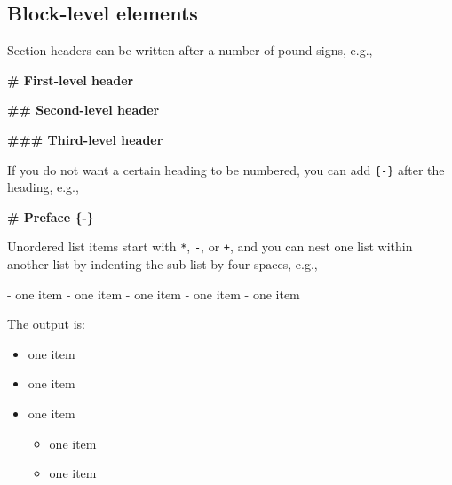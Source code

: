 \documentclass[
  12pt,
]{krantz}
\newenvironment{Shaded}{\begin{snugshade}}{\end{snugshade}}
\newcommand{\FunctionTok}[1]{\textcolor[rgb]{0.13,0.29,0.53}{\textbf{#1}}}
\newcommand{\NormalTok}[1]{#1}
\newcommand{\SpecialStringTok}[1]{\textcolor[rgb]{0.31,0.60,0.02}{#1}}
\providecommand{\tightlist}{%
  \setlength{\itemsep}{0pt}\setlength{\parskip}{0pt}}
\theoremstyle{definition}
\theoremstyle{definition}
\theoremstyle{definition}
\theoremstyle{definition}
\theoremstyle{remark}
\begin{document}
\subsection{Block-level elements}\label{block-level-elements}

Section headers can be written after a number of pound signs, e.g.,

\begin{Shaded}
\begin{Highlighting}[]
\FunctionTok{\# First{-}level header}

\FunctionTok{\#\# Second{-}level header}

\FunctionTok{\#\#\# Third{-}level header}
\end{Highlighting}
\end{Shaded}

If you do not want a certain heading to be numbered, you can add \texttt{\{-\}} after the heading, e.g.,

\begin{Shaded}
\begin{Highlighting}[]
\FunctionTok{\# Preface \{{-}\}}
\end{Highlighting}
\end{Shaded}

Unordered list items start with \texttt{*}, \texttt{-}, or \texttt{+}, and you can nest one list within another list by indenting the sub-list by four spaces, e.g.,

\begin{Shaded}
\begin{Highlighting}[]
\SpecialStringTok{{-} }\NormalTok{one item}
\SpecialStringTok{{-} }\NormalTok{one item}
\SpecialStringTok{{-} }\NormalTok{one item}
\SpecialStringTok{    {-} }\NormalTok{one item}
\SpecialStringTok{    {-} }\NormalTok{one item}
\end{Highlighting}
\end{Shaded}

The output is:

\begin{itemize}
\tightlist
\item
  one item
\item
  one item
\item
  one item

  \begin{itemize}
  \tightlist
  \item
    one item
  \item
    one item
  \end{itemize}
\end{itemize}
\end{document}
